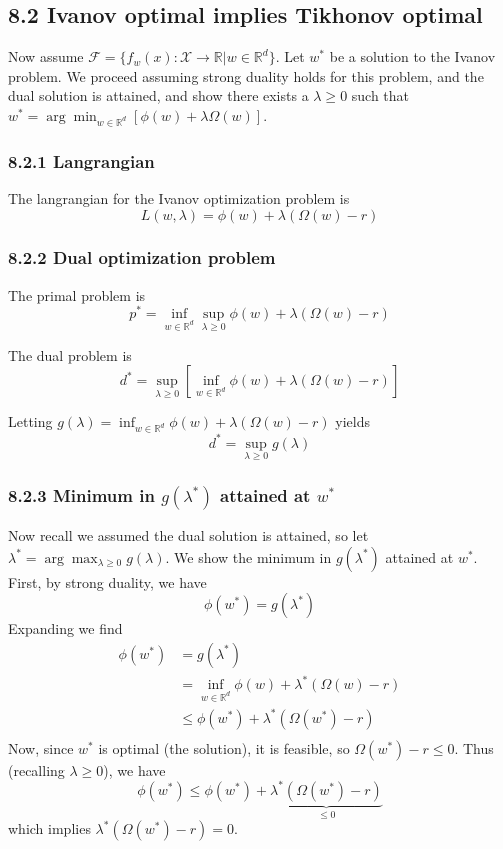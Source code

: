 \documentclass[paper=a4, fontsize=11pt]{scrartcl} %
\numberwithin{equation}{section} %
\numberwithin{figure}{section} %
\numberwithin{table}{section} %
\begin{document}
\subsection*{8.2 Ivanov optimal implies  Tikhonov optimal}

Now assume $\mathcal{F} = \{f_w(x):\mathcal{X} \to \mathbb{R} | w \in \mathbb{R}^d\}$. Let $w^*$ be a solution to the Ivanov problem. We proceed assuming strong duality holds for this problem, and the dual solution is attained, and show there exists a $\lambda \geq 0 $ such that $w^* = \arg \min_{w \in \mathbb{R}^d} [\phi(w) + \lambda \Omega(w)]$.

\subsubsection*{8.2.1 Langrangian}
The langrangian for the Ivanov optimization problem is
\[L(w, \lambda) = \phi(w) + \lambda(\Omega(w) - r)\]

\subsubsection*{8.2.2 Dual optimization problem}

The primal problem is
\[p^* = \inf_{w \in \mathbb{R}^d} \sup_{\lambda \geq 0} \phi(w) + \lambda(\Omega(w)-r)\]

The dual problem is
\[d^* = \sup_{\lambda \geq 0} \left[\inf_{w \in \mathbb{R}^d} \phi(w) + \lambda(\Omega(w)-r)\right]\]

Letting $g(\lambda) = \inf_{w \in \mathbb{R}^d} \phi(w) + \lambda(\Omega(w)-r)$ yields
\[d^* = \sup_{\lambda \geq 0} g(\lambda)\]

\subsubsection*{8.2.3 Minimum in $g(\lambda^*)$ attained at $w^*$}

Now recall we assumed the dual solution is attained, so let $\lambda^* = \arg \max_{\lambda \geq 0} g(\lambda)$. We show the minimum  in $g(\lambda^*)$ attained at $w^*$.
First, by strong duality, we have
\[\phi(w^*) = g(\lambda^*)\]
Expanding we find
\begin{align*}
\phi(w^*) &= g(\lambda^*) \\
	&=  \inf_{w \in \mathbb{R}^d} \phi(w) + \lambda^*(\Omega(w)-r) \\
	&\leq \phi(w^*) + \lambda^*(\Omega(w^*)-r) \\
\end{align*}
Now, since $w^*$ is optimal (the solution), it is feasible, so $\Omega(w^*)-r \leq 0$. Thus (recalling $\lambda \geq 0$), we have
\[\phi(w^*) \leq \phi(w^*) + \underbrace{\lambda^*(\Omega(w^*)-r) }_{\leq 0}\]
which implies $\lambda^*(\Omega(w^*)-r) = 0$.
\end{document}
